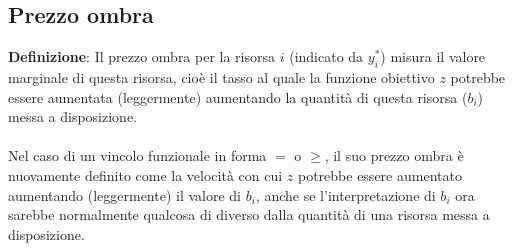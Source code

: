 \documentclass[12pt,a4paper]{article}
\begin{document}
\subsection{Prezzo ombra}
\textbf{Definizione}: Il prezzo ombra per la risorsa $i$ (indicato da $y_i^*$) misura il valore marginale di questa risorsa, cioè il tasso al quale la funzione obiettivo $z$ potrebbe essere aumentata (leggermente) aumentando la quantità di questa risorsa ($b_i$) messa a disposizione.\\\\
Nel caso di un vincolo funzionale in forma $=$ o $\geq$, il suo prezzo ombra è nuovamente definito come la velocità con cui $z$ potrebbe essere aumentato aumentando (leggermente) il valore di $b_i$, anche se l'interpretazione di $b_i$ ora sarebbe normalmente qualcosa di diverso dalla quantità di una risorsa messa a disposizione.\\
\end{document}
